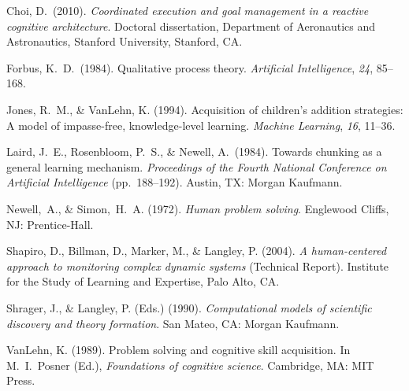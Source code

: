 \documentclass[11pt,letterpaper]{article}
\begin{document}
{\parindent -10pt\leftskip 10pt\noindent




Choi, D.\ (2010). {\it Coordinated execution and goal management in a 
reactive cognitive architecture\/}. Doctoral dissertation, Department 
of Aeronautics and Astronautics, Stanford University, Stanford, CA.


Forbus, K.\ D.\ (1984). Qualitative process theory. {\it Artificial
Intelligence\/}, {\it 24\/}, 85--168.


Jones, R.~M., \& VanLehn, K. (1994). Acquisition of children's addition
strategies: A model of impasse-free, knowledge-level learning. {\it
Machine Learning\/}, {\it 16\/}, 11--36.


Laird, J.\ E., Rosenbloom, P.\ S., \& Newell, A.\ (1984). Towards 
chunking as a general learning mechanism. {\it Proceedings of the
Fourth National Conference on Artificial Intelligence\/} (pp.\ 
188--192). Austin, TX: Morgan Kaufmann.


Newell,~A., \& Simon,~H.~A. (1972). {\it Human problem solving\/}.
Englewood Cliffs, NJ: Prentice-Hall. 


Shapiro, D., Billman, D., Marker, M., \& Langley, P. (2004). {\it A
human-centered approach to monitoring complex dynamic systems\/}
(Technical Report). Institute for the Study of Learning and Expertise,
Palo Alto, CA.




Shrager, J., \& Langley, P. (Eds.) (1990). {\it Computational models
of scientific discovery and theory formation}. San Mateo, CA: Morgan
Kaufmann.


VanLehn, K. (1989). Problem solving and cognitive skill acquisition.
In M.\ I.\ Posner (Ed.), {\it Foundations of cognitive science\/}.
Cambridge, MA: MIT Press.

}
\end{document}
